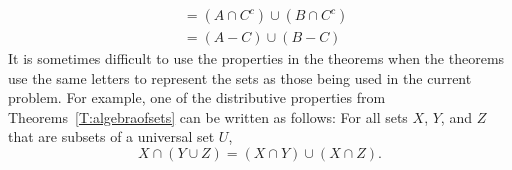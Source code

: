 \begin{prog}
\begin{enumerate}
\begin{align*}
                              &= \left( A \cap C^c \right) \cup \left( B \cap C^c \right) \\
                              &= \left( A - C \right) \cup \left( B - C \right)
\end{align*}
\note It is sometimes difficult to use the properties in the theorems when the theorems use the same letters to represent the sets as those being used in the current problem.  For example, one of the distributive properties from Theorems~\ref{T:algebraofsets} can be written as follows:  For all sets $X$, $Y$, and $Z$ that are subsets of a universal set $U$,
\[
X \cap \left( Y \cup Z \right) = \left( X \cap Y \right) \cup \left( X \cap Z \right).
\]
\end{enumerate}
\end{prog}
\hbreak


\endinput
